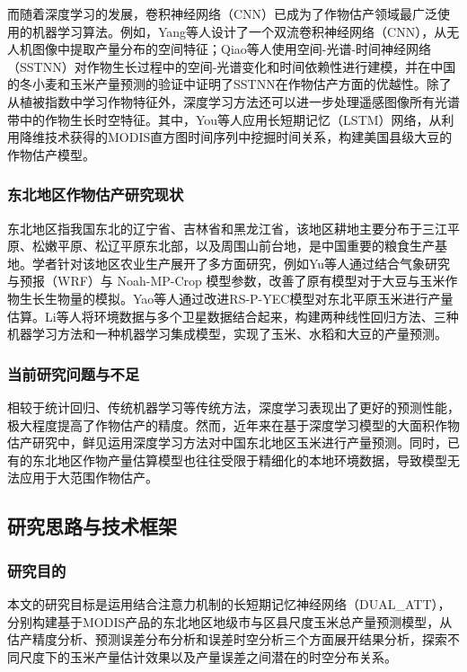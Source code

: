\par 而随着深度学习的发展，卷积神经网络（CNN）已成为了作物估产领域最广泛使用的机器学习算法\cite{van2020crop}。例如，Yang等人设计了一个双流卷积神经网络（CNN），从无人机图像中提取产量分布的空间特征\cite{yang2019deep}；Qiao等人使用空间-光谱-时间神经网络（SSTNN）对作物生长过程中的空间-光谱变化和时间依赖性进行建模\cite{qiao2021crop}，并在中国的冬小麦和玉米产量预测的验证中证明了SSTNN在作物估产方面的优越性。除了从植被指数中学习作物特征外，深度学习方法还可以进一步处理遥感图像所有光谱带中的作物生长时空特征。其中，You等人应用长短期记忆（LSTM）网络，从利用降维技术获得的MODIS直方图时间序列中挖掘时间关系，构建美国县级大豆的作物估产模型\cite{you2017deep}。

\subsubsection{东北地区作物估产研究现状}

\par 东北地区指我国东北的辽宁省、吉林省和黑龙江省，该地区耕地主要分布于三江平原、松嫩平原、松辽平原东北部，以及周围山前台地，是中国重要的粮食生产基地。学者针对该地区农业生产展开了多方面研究，例如Yu等人通过结合气象研究与预报（WRF）与 Noah-MP-Crop 模型参数，改善了原有模型对于大豆与玉米作物生长生物量的模拟\cite{YU2022107323}。Yao等人通过改进RS-P-YEC模型对东北平原玉米进行产量估算\cite{yao2015estimation}。Li等人将环境数据与多个卫星数据结合起来，构建两种线性回归方法、三种机器学习方法和一种机器学习集成模型，实现了玉米、水稻和大豆的产量预测\cite{li2022exploring}。

\subsubsection{当前研究问题与不足}
\par 相较于统计回归、传统机器学习等传统方法，深度学习表现出了更好的预测性能，极大程度提高了作物估产的精度。然而，近年来在基于深度学习模型的大面积作物估产研究中，鲜见运用深度学习方法对中国东北地区玉米进行产量预测。同时，已有的东北地区作物产量估算模型也往往受限于精细化的本地环境数据，导致模型无法应用于大范围作物估产。

\subsection{研究思路与技术框架}

\subsubsection{研究目的}
\par 本文的研究目标是运用结合注意力机制的长短期记忆神经网络（DUAL\_ATT），分别构建基于MODIS产品的东北地区地级市与区县尺度玉米总产量预测模型，从估产精度分析、预测误差分布分析和误差时空分析三个方面展开结果分析，探索不同尺度下的玉米产量估计效果以及产量误差之间潜在的时空分布关系。

